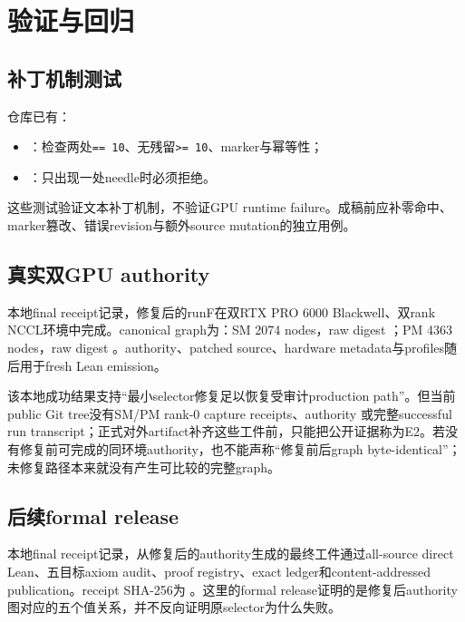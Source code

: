 \documentclass[10.5pt,a4paper]{ctexart}
\begin{document}
\section{验证与回归}

\subsection{补丁机制测试}

仓库已有：
\begin{itemize}
  \item {}：检查两处\texttt{== 10}、无残留\texttt{>= 10}、marker与幂等性；
  \item {}：只出现一处needle时必须拒绝。
\end{itemize}

这些测试验证文本补丁机制，不验证GPU runtime failure。成稿前应补零命中、marker篡改、错误revision与额外source mutation的独立用例。

\subsection{真实双GPU authority}

本地final receipt记录，修复后的runF在双RTX PRO 6000 Blackwell、双rank NCCL环境中完成。canonical graph为：SM 2074 nodes，raw digest
；PM 4363 nodes，raw digest
。authority、patched source、hardware metadata与profiles随后用于fresh Lean emission。

该本地成功结果支持“最小selector修复足以恢复受审计production path”。但当前public Git tree没有SM/PM rank-0 capture receipts、authority 或完整successful run transcript；正式对外artifact补齐这些工件前，只能把公开证据称为E2。若没有修复前可完成的同环境authority，也不能声称“修复前后graph byte-identical”；未修复路径本来就没有产生可比较的完整graph。

\subsection{后续formal release}

本地final receipt记录，从修复后的authority生成的最终工件通过all-source direct Lean、五目标axiom audit、proof registry、exact ledger和content-addressed publication。receipt SHA-256为 。这里的formal release证明的是修复后authority图对应的五个值关系，并不反向证明原selector为什么失败。
\end{document}

